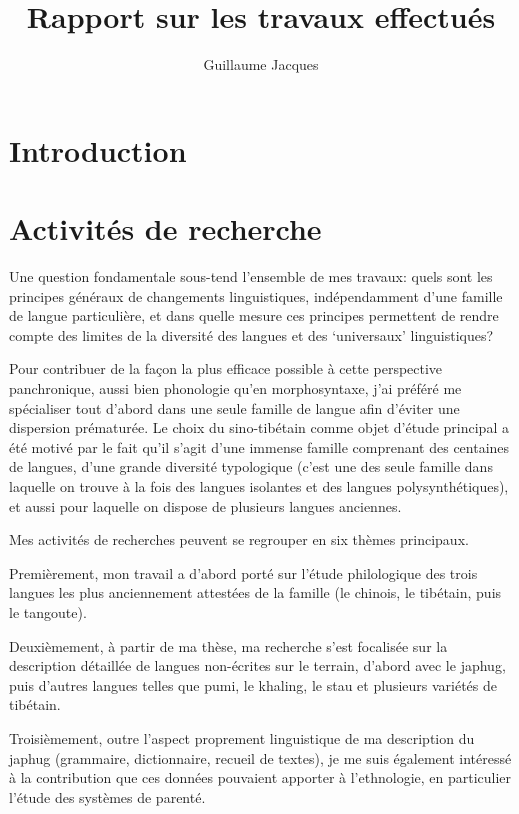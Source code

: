 \documentclass[oldfontcommands,oneside,a4paper,11pt]{article}
\begin{document}
\title{Rapport sur les travaux effectués}
\author{Guillaume Jacques}
\maketitle

\sloppy
%
\section{Introduction}

\section{Activités de recherche}
Une question fondamentale sous-tend l'ensemble de mes travaux: quels sont les principes généraux de changements linguistiques, indépendamment d'une famille de langue particulière, et dans quelle mesure  ces principes permettent de rendre compte des limites de la diversité des langues et des `universaux' linguistiques?

Pour contribuer de la façon la plus efficace possible à cette perspective panchronique,  aussi bien phonologie qu'en morphosyntaxe, j'ai préféré me spécialiser tout d'abord dans une seule famille de langue afin d'éviter une dispersion prématurée. Le choix du sino-tibétain comme objet d'étude principal a été motivé par le fait qu'il s'agit d'une immense famille comprenant des centaines de langues, d'une grande diversité typologique (c'est une des seule famille dans laquelle on trouve à la fois des langues isolantes et des langues polysynthétiques), et aussi pour laquelle on dispose de plusieurs langues anciennes.

Mes activités de recherches peuvent se regrouper en six thèmes principaux.

Premièrement, mon travail a d'abord porté sur l'étude philologique des trois langues les plus anciennement attestées de la famille (le chinois, le tibétain, puis le tangoute). 

Deuxièmement, à partir de ma thèse, ma recherche s'est focalisée sur la description détaillée de langues non-écrites sur le terrain, d'abord avec le japhug, puis d'autres langues telles que pumi, le khaling, le stau et plusieurs variétés de tibétain. 

Troisièmement, outre l'aspect proprement linguistique de ma description du japhug (grammaire, dictionnaire, recueil de textes), je me suis également intéressé à la contribution que ces données pouvaient apporter à l'ethnologie, en particulier l'étude des systèmes de parenté.
\end{document}
